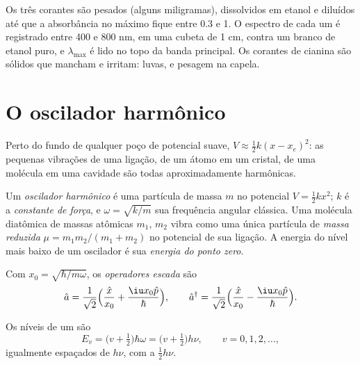 \begin{inthelab}
Os três corantes são pesados (alguns miligramas), dissolvidos em etanol e
diluídos até que a absorbância no máximo fique entre 0.3 e 1. O espectro
de cada um é registrado entre 400 e 800 nm, em uma cubeta de 1 cm, contra
um branco de etanol puro, e $\lambda_{\max}$ é lido no topo da banda
principal. Os corantes de cianina são sólidos que mancham e irritam: luvas,
e pesagem na capela.
\end{inthelab}

\section{O oscilador harmônico}

Perto do fundo de qualquer poço de potencial suave, $V \approx \frac12 k(x - x_e)^2$:
as pequenas vibrações de uma ligação, de um átomo em um cristal, de uma
molécula em uma cavidade são todas aproximadamente harmônicas.

\begin{definition}\label{def:b3:quantum-model-systems:oscillator}
Um \emph{oscilador harmônico} é uma partícula de
massa $m$ no potencial $V = \frac12 kx^2$; $k$ é a \emph{constante de
força}, e $\omega = \sqrt{k/m}$ sua frequência
angular clássica. Uma molécula diatômica de massas atômicas $m_1$, $m_2$
vibra como uma única partícula de \emph{massa reduzida}
$\mu = m_1m_2/(m_1 + m_2)$ no potencial de sua ligação. A energia do
nível mais baixo de um oscilador é sua \emph{energia do ponto zero}.
\end{definition}

\begin{definition}\label{def:b3:quantum-model-systems:ladder}
Com $x_0 = \sqrt{\hbar/m\omega}$, os \emph{operadores escada}
são
\[
\hat a = \frac{1}{\sqrt2}\Big(\frac{\hat x}{x_0} + \frac{\iu x_0\hat p}{\hbar}\Big),
\qquad \hat a^\dagger = \frac{1}{\sqrt2}\Big(\frac{\hat x}{x_0} -
\frac{\iu x_0\hat p}{\hbar}\Big).
\]
\end{definition}

\begin{theorem}\label{thm:b3:quantum-model-systems:oscillator}
Os níveis de um  são
\[
E_v = \big(v + \tfrac12\big)\hbar\omega = \big(v + \tfrac12\big)h\nu, \qquad v =
0, 1, 2, \dots,
\]
igualmente espaçados de $h\nu$, com a  $\frac12h\nu$.
\end{theorem}

